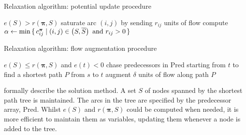 \begin{algorithm}
    \caption{Relaxation algorithm: potential update procedure}
    \label{algo:relaxation-update-potentials}
    \begin{algorithmic}[1]
        \Require $e(S) > r(\boldsymbol{\pi},S)$
        \Statex
         \label{algo:relaxation-update-potentials:saturate-loop}
        \State saturate arc $(i,j)$ by sending $r_{ij}$ units of flow \label{algo:relaxation-update-potentials:saturate-cmd}
        \EndFor
        \State compute $\alpha \gets \min\set{c_{ij}^{\boldsymbol{\pi}} | (i,j)\in\left(S,\overline{S}\right)\mbox{ and }r_{ij}>0}$
        \label{algo:relaxation-update-potentials:compute-alpha}
        \label{algo:relaxation-update-potentials:update-loop}
        \label{algo:relaxation-update-potentials:update-cmd}
        \EndFor
        \EndFunction
    \end{algorithmic}
\end{algorithm}

\begin{algorithm}
    \caption{Relaxation algorithm: flow augmentation procedure}
    \label{algo:relaxation-augment-flow}
    \begin{algorithmic}[1]
        \Require $e(S) \leq r(\boldsymbol{\pi},S)$ and $e(t) < 0$
        \Statex
        \State chase predecessors in $\mathrm{Pred}$ starting from $t$ to find a shortest path $P$ from $s$ to $t$ \label{algo:relaxation-augment-flow:find-P}
         \label{algo:relaxation-augment-flow:compute-delta}
        \State augment $\delta$ units of flow along path $P$ \label{algo:relaxation-augment-flow:augment-path}
        \EndFunction
    \end{algorithmic}
\end{algorithm}

 formally describe the solution method. A set $S$ of nodes spanned by the shortest path tree is maintained. The arcs in the tree are specified by the predecessor array, $\mathrm{Pred}$. Whilst $e(S)$ and $r(\boldsymbol{\pi},S)$ could be computed when needed, it is more efficient to maintain them as variables, updating them whenever a node is added to the tree.

